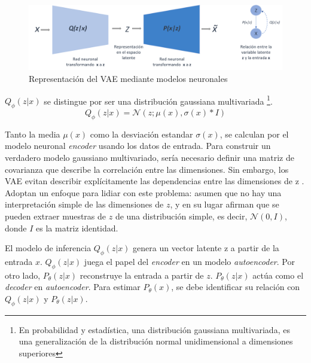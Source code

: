 \begin{figure}[!h]
	\centering
	
	\includegraphics[width=5in]{Graphics/VAEQPDistribution.png}
	
	\caption{ \small{Representación del VAE mediante modelos neuronales}}
	
	\label{VAEQPDistrib}
	
\end{figure}


$Q_{\phi}(z|x)$ se distingue por ser una distribución gaussiana multivariada \footnote{En probabilidad y estadística, una distribución gaussiana multivariada, es una generalización de la distribución normal unidimensional a dimensiones superiores}. 
\begin{equation}
	Q_{\phi}(z|x) = \mathcal{N}(z; \mu(x), \sigma(x)*I)
\end{equation}

Tanto la media $\mu(x)$ como la desviación estandar $\sigma(x)$, se calculan por el modelo neuronal \textit{encoder} usando los datos de entrada. Para construir un verdadero modelo gaussiano multivariado, sería necesario definir una matriz de covarianza que describe la correlación entre las dimensiones. Sin embargo, los VAE evitan describir explícitamente las dependencias entre las dimensiones de z \cite{VAETutorial}. Adoptan un enfoque para lidiar con este problema: asumen que no hay una interpretación simple de las dimensiones de $z$, y en su lugar afirman que se pueden extraer muestras de $z$ de una distribución simple, es decir, $\mathcal{N}(0, I)$, donde $I$ es la matriz identidad.


El modelo de inferencia $Q_{\phi}(z|x)$ genera un vector latente z a partir de la entrada $x$. $Q_{\phi}(z|x)$ juega el papel del \textit{encoder} en un modelo \textit{autoencoder}. Por otro lado, $P_{\theta}(z|x)$ reconstruye la entrada a partir de $z$. $P_{\theta}(z|x)$ actúa como el \textit{decoder} en \textit{autoencoder}. Para estimar $P_{\theta}(x)$, se debe identificar su relación con $Q_{\phi}(z|x)$ y $P_{\theta}(z|x)$. 

